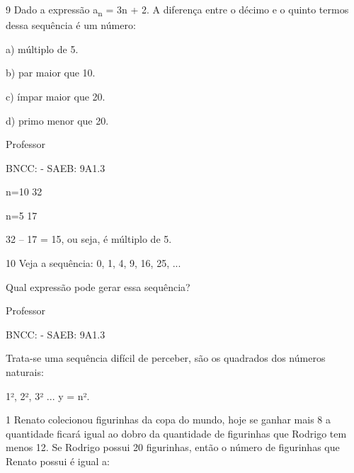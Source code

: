 \begin{escolha}
{{{\begin{escolha}
{

\num{9} Dado a expressão a\textsubscript{n} = 3n + 2. A diferença entre o
décimo e o quinto termos dessa sequência é um número:

a) múltiplo de 5.

b) par maior que 10.

c) ímpar maior que 20.

d) primo menor que 20.

Professor

BNCC: - SAEB: 9A1.3

n=10 32

n=5 17

32 -- 17 = 15, ou seja, é múltiplo de 5.

\num{10} Veja a sequência: 0, 1, 4, 9, 16, 25, ...

Qual expressão pode gerar essa sequência?

Professor

BNCC: - SAEB: 9A1.3

Trata-se uma sequência difícil de perceber, são os quadrados dos números
naturais:

1², 2², 3² ... y = n².


\num{1} Renato colecionou figurinhas da copa do mundo, hoje se ganhar mais 8
a quantidade ficará igual ao dobro da quantidade de figurinhas que
Rodrigo tem menos 12. Se Rodrigo possui 20 figurinhas, então o número de
figurinhas que Renato possui é igual a:

}
\end{escolha}}}}
\end{escolha}
